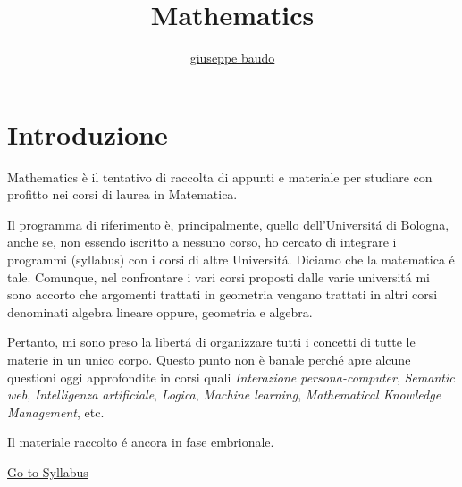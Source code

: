 \documentclass[a4paper,10pt]{article}
\title{Mathematics}
\author{\href{http://www.baudo.hol.es}{giuseppe baudo}}
\begin{document}
	
	\maketitle
	
	\section{Introduzione}		
	Mathematics è il tentativo di raccolta di appunti e materiale per studiare con profitto nei corsi di laurea in Matematica.
	
	Il programma di riferimento \`{e}, principalmente, quello dell'Universit\'{a}
	di Bologna, anche se, non essendo iscritto a nessuno corso, ho cercato di integrare i programmi (syllabus) con i corsi di altre Universit\'{a}. Diciamo che la matematica \'{e} tale.
	Comunque, nel confrontare i vari corsi proposti dalle varie universit\'{a} mi sono accorto che argomenti trattati in geometria vengano trattati in altri corsi denominati algebra lineare oppure, geometria e algebra.
	
	Pertanto, mi sono preso la libert\'{a} di organizzare tutti i concetti di tutte le materie in un unico corpo. Questo punto non \`{e} banale perch\'{e} apre alcune questioni oggi
	approfondite in corsi quali \textit{Interazione persona-computer}, \textit{Semantic web}, \textit{Intelligenza artificiale}, \textit{Logica}, \textit{Machine learning}, \textit{Mathematical Knowledge Management}, etc.
	
	Il materiale raccolto \'{e} ancora in fase embrionale. 
	
	
	
	\href{Syllabus.html}{Go to Syllabus}
	
\end{document}
